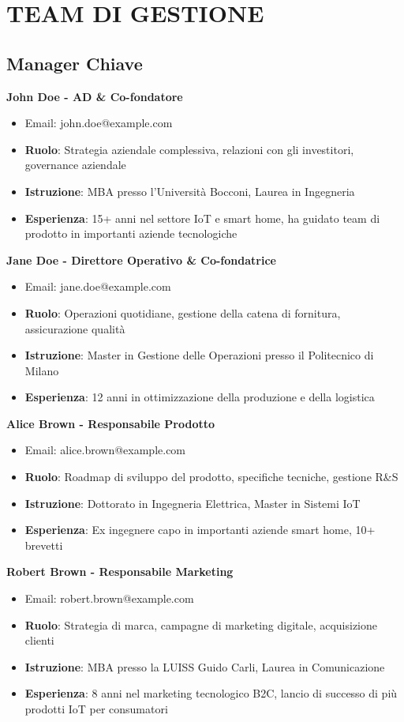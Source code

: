 \documentclass[11pt,a4paper]{report}
\begin{document}
\chapter{TEAM DI GESTIONE}

\section{Manager Chiave}

\textbf{John Doe - AD \& Co-fondatore}
\begin{itemize}
    \item Email: john.doe@example.com
    \item \textbf{Ruolo}: Strategia aziendale complessiva, relazioni con gli investitori, governance aziendale
    \item \textbf{Istruzione}: MBA presso l'Università Bocconi, Laurea in Ingegneria
    \item \textbf{Esperienza}: 15+ anni nel settore IoT e smart home, ha guidato team di prodotto in importanti aziende tecnologiche
\end{itemize}

\textbf{Jane Doe - Direttore Operativo \& Co-fondatrice}
\begin{itemize}
    \item Email: jane.doe@example.com
    \item \textbf{Ruolo}: Operazioni quotidiane, gestione della catena di fornitura, assicurazione qualità
    \item \textbf{Istruzione}: Master in Gestione delle Operazioni presso il Politecnico di Milano
    \item \textbf{Esperienza}: 12 anni in ottimizzazione della produzione e della logistica
\end{itemize}

\textbf{Alice Brown - Responsabile Prodotto}
\begin{itemize}
    \item Email: alice.brown@example.com
    \item \textbf{Ruolo}: Roadmap di sviluppo del prodotto, specifiche tecniche, gestione R\&S
    \item \textbf{Istruzione}: Dottorato in Ingegneria Elettrica, Master in Sistemi IoT
    \item \textbf{Esperienza}: Ex ingegnere capo in importanti aziende smart home, 10+ brevetti
\end{itemize}

\textbf{Robert Brown - Responsabile Marketing}
\begin{itemize}
    \item Email: robert.brown@example.com
    \item \textbf{Ruolo}: Strategia di marca, campagne di marketing digitale, acquisizione clienti
    \item \textbf{Istruzione}: MBA presso la LUISS Guido Carli, Laurea in Comunicazione
    \item \textbf{Esperienza}: 8 anni nel marketing tecnologico B2C, lancio di successo di più prodotti IoT per consumatori
\end{itemize}
\end{document}
